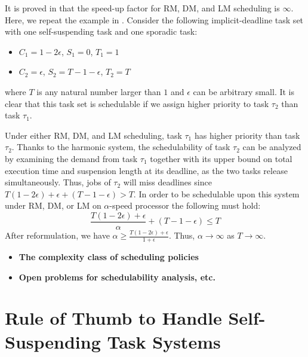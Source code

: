 It is proved in \cite{huangpass:dac2015} that the speed-up factor for RM, DM, and LM scheduling is $\infty$. Here, we repeat the example in \cite{huangpass:dac2015}. Consider the following implicit-deadline task set with one self-suspending task and one sporadic task:
\begin{itemize}
 \setlength\itemsep{0em}
\item $C_1=1-2\epsilon$, $S_1=0$, $T_1=1$
\item  $C_2=\epsilon$, $S_2=T-1-\epsilon$, $T_2=T$
\end{itemize}
where $T$ is any natural number larger than $1$ and $\epsilon$ can be arbitrary small.
It is clear that this task set is schedulable if we assign higher priority to
task $\tau_2$ than task $\tau_1$.

Under either RM, DM, and LM scheduling, task $\tau_1$ has higher priority than task $\tau_2$. 
Thanks to the harmonic system, the schedulability of task $\tau_2$ can be analyzed by examining the demand from task $\tau_1$ together with its upper bound on total execution time and suspension length at its deadline, as the two tasks release simultaneously.
Thus, jobs of $\tau_2$ will miss deadlines since $T( 1-2\epsilon)+\epsilon+(T-1-\epsilon) > T$.
In order to be schedulable upon this system under RM, DM, or LM on $\alpha$-speed processor the following must hold:
\begin{equation*}
\frac{T( 1-2\epsilon)+\epsilon}{\alpha}+(T-1-\epsilon) \le T
\end{equation*}
After reformulation, we have $\alpha\ge \frac{T( 1-2\epsilon)+\epsilon}{1+\epsilon}$. Thus, $\alpha\rightarrow \infty$ as $T \rightarrow \infty$.


   
\begin{itemize}
\item \textbf{The complexity class of scheduling policies}
\item \textbf{Open problems for schedulability analysis, etc.}
\end{itemize}
  
\section{Rule of Thumb to Handle Self-Suspending Task Systems}